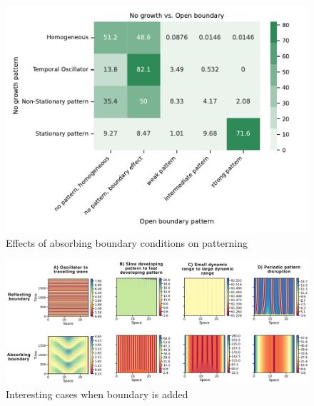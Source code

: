 \begin{figure}[H] %
    \centering
    \begin{adjustbox}{center}
        \includegraphics[width=1\textwidth]{chapters/Chapter 1/nogrowth_openboundary_confusion_variant0-11-12} %
    \end{adjustbox}
    \caption{Effects of absorbing boundary conditions on patterning}
    \label{fig:nogrowth_openboundary_confusion_variant0} %
\end{figure}


\begin{figure}[H] %
    \centering
    \begin{adjustbox}{center}
        \includegraphics[width=1\textwidth]{chapters/Chapter 1/interesting_cases_openboundary} %
    \end{adjustbox}
    \caption{Interesting cases when boundary is added}
    \label{fig:interesting_cases_openboundary} %
\end{figure}


